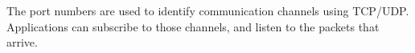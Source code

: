 The port numbers are used to identify communication channels using TCP/UDP. 
Applications can subscribe to those channels, and listen to the packets that arrive.

